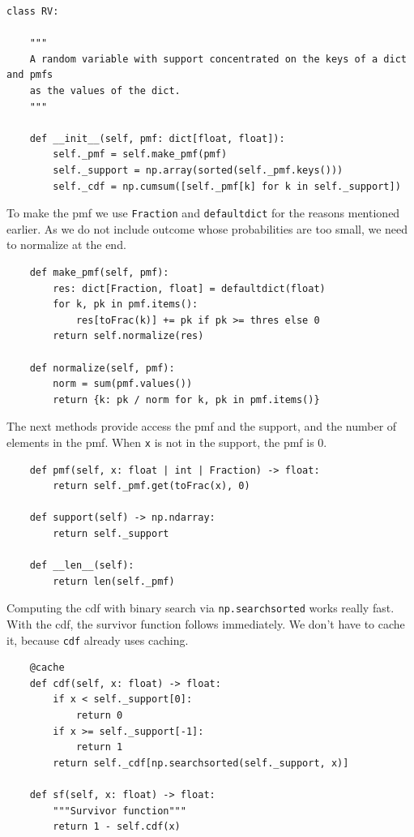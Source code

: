 \documentclass[queueing-book]{subfiles}
\begin{document}
\begin{verbatim}
class RV:

    """
    A random variable with support concentrated on the keys of a dict and pmfs
    as the values of the dict.
    """

    def __init__(self, pmf: dict[float, float]):
        self._pmf = self.make_pmf(pmf)
        self._support = np.array(sorted(self._pmf.keys()))
        self._cdf = np.cumsum([self._pmf[k] for k in self._support])
\end{verbatim}


To make the pmf we use \texttt{Fraction} and \texttt{defaultdict} for the reasons mentioned earlier.
As we do not include outcome whose probabilities are too small, we need to normalize at the end.

\begin{verbatim}
    def make_pmf(self, pmf):
        res: dict[Fraction, float] = defaultdict(float)
        for k, pk in pmf.items():
            res[toFrac(k)] += pk if pk >= thres else 0
        return self.normalize(res)

    def normalize(self, pmf):
        norm = sum(pmf.values())
        return {k: pk / norm for k, pk in pmf.items()}
\end{verbatim}

The next methods provide access the pmf and the support, and the number of elements in the pmf.
When \texttt{x} is not in the support, the pmf is \(0\).
\begin{verbatim}
    def pmf(self, x: float | int | Fraction) -> float:
        return self._pmf.get(toFrac(x), 0)

    def support(self) -> np.ndarray:
        return self._support

    def __len__(self):
        return len(self._pmf)
\end{verbatim}

Computing the cdf with binary search via \texttt{np.searchsorted} works really fast.
With the cdf, the survivor function follows immediately. We don't have to cache it, because \texttt{cdf} already uses caching.
\begin{verbatim}
    @cache
    def cdf(self, x: float) -> float:
        if x < self._support[0]:
            return 0
        if x >= self._support[-1]:
            return 1
        return self._cdf[np.searchsorted(self._support, x)]

    def sf(self, x: float) -> float:
        """Survivor function"""
        return 1 - self.cdf(x)
\end{verbatim}
\end{document}
